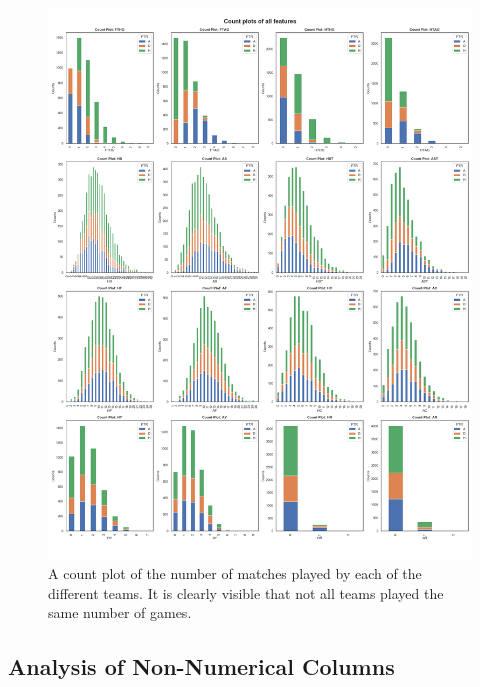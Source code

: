 \documentclass[a4paper,12pt]{article}
\begin{document}
	\begin{figure}[H]
		\renewcommand\thefigure{2.2}
		\centering
		
		\includegraphics[scale=0.32]{count_plot_all.png}
		\caption{A count plot of the number of matches played by each of the different teams. It is clearly visible that not all teams played the same number of games.}
	\end{figure}
	
	\subsection{Analysis of Non-Numerical Columns}
	
\end{document}
